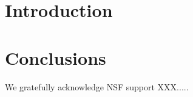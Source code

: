 \documentclass[prb,preprint]{revtex4-1}
\begin{document}
\section{Introduction \label{sec:intro}} 


\section{Conclusions \label{sec:conclusions}} 


\begin{acknowledgments}

We gratefully acknowledge NSF support XXX.....

\end{acknowledgments}


\begin{thebibliography}{99}


\end{thebibliography}
\end{document}
